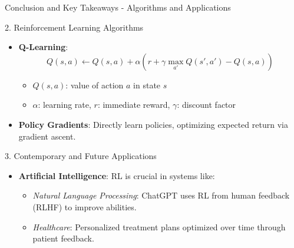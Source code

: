 \documentclass[aspectratio=169]{beamer}
\begin{document}
\begin{frame}[fragile]{Conclusion and Key Takeaways - Algorithms and Applications}
    \begin{block}{2. Reinforcement Learning Algorithms}
        \begin{itemize}
            \item \textbf{Q-Learning}:
            \begin{equation}
                Q(s,a) \leftarrow Q(s,a) + \alpha \left( r + \gamma \max_{a'} Q(s',a') - Q(s,a) \right)
            \end{equation}
            \begin{itemize}
                \item \(Q(s,a)\): value of action \(a\) in state \(s\)
                \item \(\alpha\): learning rate, \(r\): immediate reward, \(\gamma\): discount factor
            \end{itemize}
            \item \textbf{Policy Gradients}: Directly learn policies, optimizing expected return via gradient ascent.
        \end{itemize}
    \end{block}

    \begin{block}{3. Contemporary and Future Applications}
        \begin{itemize}
            \item \textbf{Artificial Intelligence}: RL is crucial in systems like:
            \begin{itemize}
                \item \textit{Natural Language Processing}: ChatGPT uses RL from human feedback (RLHF) to improve abilities.
                \item \textit{Healthcare}: Personalized treatment plans optimized over time through patient feedback.
            \end{itemize}
        \end{itemize}
    \end{block}
\end{frame}
\end{document}
